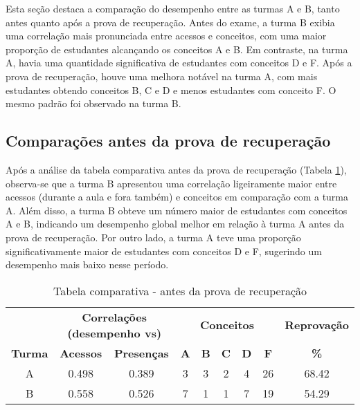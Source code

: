 Esta seção destaca a comparação do desempenho entre as turmas A e B, tanto antes quanto após a prova de recuperação. Antes do exame, a turma B exibia uma correlação mais pronunciada entre acessos e conceitos, com uma maior proporção de estudantes alcançando os conceitos A e B. Em contraste, na turma A, havia uma quantidade significativa de estudantes com conceitos D e F. Após a prova de recuperação, houve uma melhora notável na turma A, com mais estudantes obtendo conceitos B, C e D e menos estudantes com conceito F. O mesmo padrão foi observado na turma B.

\subsection{Comparações antes da prova de recuperação}

Após a análise da tabela comparativa antes da prova de recuperação (Tabela \ref{tab:antes-recuperacao}), observa-se que a turma B apresentou uma correlação ligeiramente maior entre acessos (durante a aula e fora também) e conceitos em comparação com a turma A. Além disso, a turma B obteve um número maior de estudantes com conceitos A e B, indicando um desempenho global melhor em relação à turma A antes da prova de recuperação. Por outro lado, a turma A teve uma proporção significativamente maior de estudantes com conceitos D e F, sugerindo um desempenho mais baixo nesse período.

\begin{table}[htbp]
    \centering
    \caption{Tabela comparativa - antes da prova de recuperação}
    \label{tab:antes-recuperacao}
    \begin{tabular}{|c|c|c|c|c|c|c|c|c|}
      \hline
      \rowcolor[HTML]{EFEFEF} 
      & \multicolumn{2}{c|}{\cellcolor[HTML]{C0C0C0}\textbf{Correlações (desempenho vs)}} & \multicolumn{5}{c|}{\cellcolor[HTML]{C0C0C0}\textbf{Conceitos}} & \cellcolor[HTML]{C0C0C0}\textbf{Reprovação} \\
      \cline{2-3} \cline{4-8} \cline{9-9}
      \rowcolor[HTML]{EFEFEF} 
      \textbf{Turma} & \textbf{Acessos} & \textbf{Presenças} & \textbf{A} & \textbf{B} & \textbf{C} & \textbf{D} & \textbf{F} & \textbf{\%} \\
      \hline
      A & 0.498 & 0.389 & 3 & 3 & 2 & 4 & 26 & 68.42 \\
      \hline
      B & 0.558 & 0.526 & 7 & 1 & 1 & 7 & 19 & 54.29 \\
      \hline
    \end{tabular}
\end{table}

